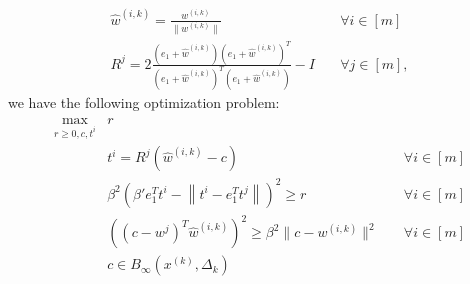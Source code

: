 \documentclass{article}
\newenvironment{comment}
  {\par\medskip
   \color{red}%
   \begin{framed}
   \textbf{Comment: }\ignorespaces}
 {\end{framed}
  \medskip}
\theoremstyle{case}
\numberwithin{theorem}{subsection}
\newcommand{\dk}{\Delta_k}
\newcommand{\tr}{{ B_{\infty}\left(\xk, \dk\right) }}
\newcommand{\wik}{{w^{(i, k)}}}
\newcommand{\xk}{x^{(k)}}
\begin{document}
\begin{align*}
\hat w^{(i,k)} = \frac {\wik} {\|\wik\|} & \quad \forall i \in [m] \\
R^j = 2 \frac{(e_1 + \hat w^{(i,k)})(e_1 + \hat w^{(i,k)})^T}{(e_1 + \hat w^{(i,k)})^T(e_1 + \hat w^{(i,k)})} - I  & \quad \forall j \in [m],
\end{align*}
we have the following optimization problem:
\begin{align*}
\begin{array} {ccc}
\max_{r \ge 0, c, t^i}	& r & \\
					& t^i = R^j\left(\hat w^{(i,k)} - c\right) 									& \quad \forall i \in [m] \\
					& \beta^2 \left(\beta' e_1^T t^i - \left\|t^i - e_1^T t^j\right\|\right)^2 \ge r			& \quad \forall i \in [m] \\
					& \left(\left(c - w^j\right)^T\hat w^{(i,k)}\right)^2 \ge \beta^2 \|c - \wik\|^2		& \quad \forall i \in [m] \\
					& c \in \tr &
\end{array}
\end{align*}

% 
% 
% 
% 
% 
% 
% 
\end{document}
